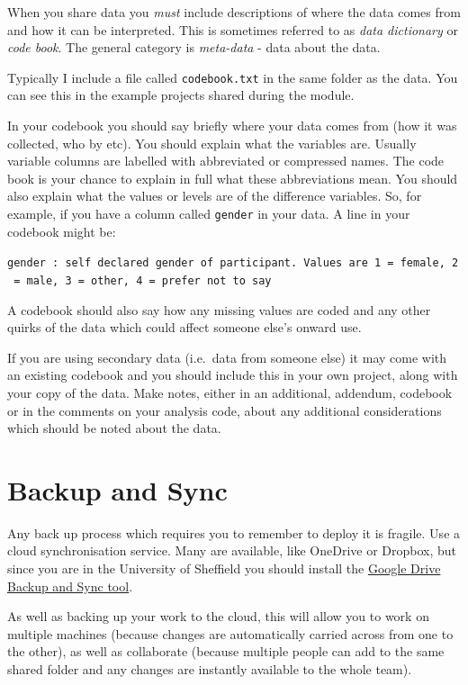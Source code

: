 \documentclass[
]{book}
\begin{document}
When you share data you \emph{must} include descriptions of where the data comes from and how it can be interpreted. This is sometimes referred to as \emph{data dictionary} or \emph{code book}. The general category is \emph{meta-data} - data about the data.

Typically I include a file called \texttt{codebook.txt} in the same folder as the data. You can see this in the example projects shared during the module.

In your codebook you should say briefly where your data comes from (how it was collected, who by etc). You should explain what the variables are. Usually variable columns are labelled with abbreviated or compressed names. The code book is your chance to explain in full what these abbreviations mean. You should also explain what the values or levels are of the difference variables. So, for example, if you have a column called \texttt{gender} in your data. A line in your codebook might be:

\texttt{gender\ :\ self\ declared\ gender\ of\ participant.\ Values\ are\ 1\ =\ female,\ 2\ =\ male,\ 3\ =\ other,\ 4\ =\ prefer\ not\ to\ say}

A codebook should also say how any missing values are coded and any other quirks of the data which could affect someone else's onward use.

If you are using secondary data (i.e.~data from someone else) it may come with an existing codebook and you should include this in your own project, along with your copy of the data. Make notes, either in an additional, addendum, codebook or in the comments on your analysis code, about any additional considerations which should be noted about the data.

\hypertarget{backup-and-sync}{%
\section{Backup and Sync}\label{backup-and-sync}}

Any back up process which requires you to remember to deploy it is fragile. Use a cloud synchronisation service. Many are available, like OneDrive or Dropbox, but since you are in the University of Sheffield you should install the \href{https://www.google.com/drive/download/}{Google Drive Backup and Sync tool}.

As well as backing up your work to the cloud, this will allow you to work on multiple machines (because changes are automatically carried across from one to the other), as well as collaborate (because multiple people can add to the same shared folder and any changes are instantly available to the whole team).
\end{document}
